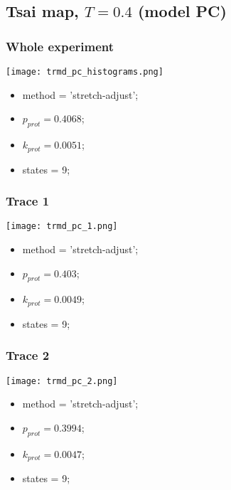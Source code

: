 \subsection{Tsai map, $T=0.4$ (model PC)}
\subsubsection{Whole experiment}
\begin{minipage}[c]{0.7\textwidth}
    \texttt{[image: trmd\_pc\_histograms.png]}
\end{minipage}
\hfill
\begin{minipage}[c]{0.45\textwidth}
    \begin{itemize}
        \item method = 'stretch-adjust';
        \item $p_{prot}=0.4068$;
        \item $k_{prot}=0.0051$;
        \item states = 9;
    \end{itemize}
\end{minipage}

\subsubsection{Trace 1}
\begin{minipage}[c]{0.7\textwidth}
	\texttt{[image: trmd\_pc\_1.png]}
\end{minipage}
\hfill
\begin{minipage}[c]{0.45\textwidth}
	\begin{itemize}
		\item method = 'stretch-adjust';
		\item $p_{prot}=0.403$;
		\item $k_{prot}=0.0049$;
		\item states = 9;
	\end{itemize}
\end{minipage}

\subsubsection{Trace 2}
\begin{minipage}[c]{0.7\textwidth}
	\texttt{[image: trmd\_pc\_2.png]}
\end{minipage}
\hfill
\begin{minipage}[c]{0.45\textwidth}
	\begin{itemize}
		\item method = 'stretch-adjust';
		\item $p_{prot}=0.3994$;
		\item $k_{prot}=0.0047$;
		\item states = 9;
	\end{itemize}
\end{minipage}

